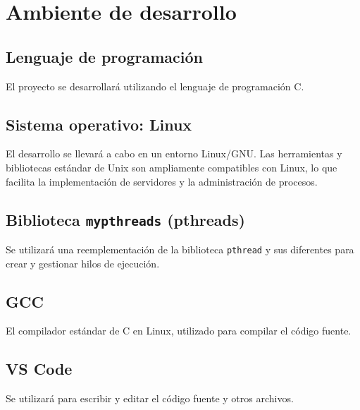 \documentclass[12pt]{article}
\begin{document}
\section{Ambiente de desarrollo}



\subsection{Lenguaje de programación}
El proyecto se desarrollará utilizando el lenguaje de programación C. 

\subsection{Sistema operativo: Linux}
El desarrollo se llevará a cabo en un entorno Linux/GNU. Las herramientas y bibliotecas estándar de Unix son ampliamente compatibles con Linux, lo que facilita la implementación de servidores y la administración de procesos.

\subsection{Biblioteca \texttt{mypthreads} (pthreads)}
Se utilizará una reemplementación de la biblioteca \texttt{pthread} y sus diferentes para crear y gestionar hilos de ejecución. 


\subsection{GCC}
El compilador estándar de C en Linux, utilizado para compilar el código fuente.
  



\subsection{VS Code}
Se utilizará para escribir y editar el código fuente y otros archivos.
\end{document}
